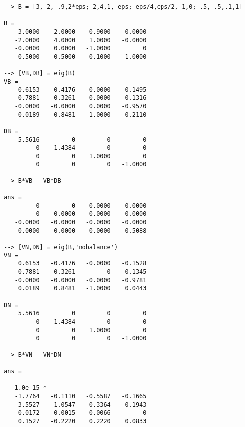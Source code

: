 \begin{verbatim}
--> B = [3,-2,-.9,2*eps;-2,4,1,-eps;-eps/4,eps/2,-1,0;-.5,-.5,.1,1]

B = 
    3.0000   -2.0000   -0.9000    0.0000 
   -2.0000    4.0000    1.0000   -0.0000 
   -0.0000    0.0000   -1.0000         0 
   -0.5000   -0.5000    0.1000    1.0000 

--> [VB,DB] = eig(B)
VB = 
    0.6153   -0.4176   -0.0000   -0.1495 
   -0.7881   -0.3261   -0.0000    0.1316 
   -0.0000   -0.0000    0.0000   -0.9570 
    0.0189    0.8481    1.0000   -0.2110 

DB = 
    5.5616         0         0         0 
         0    1.4384         0         0 
         0         0    1.0000         0 
         0         0         0   -1.0000 

--> B*VB - VB*DB

ans = 
         0         0    0.0000   -0.0000 
         0    0.0000   -0.0000    0.0000 
   -0.0000   -0.0000   -0.0000   -0.0000 
    0.0000    0.0000    0.0000   -0.5088 

--> [VN,DN] = eig(B,'nobalance')
VN = 
    0.6153   -0.4176   -0.0000   -0.1528 
   -0.7881   -0.3261         0    0.1345 
   -0.0000   -0.0000   -0.0000   -0.9781 
    0.0189    0.8481   -1.0000    0.0443 

DN = 
    5.5616         0         0         0 
         0    1.4384         0         0 
         0         0    1.0000         0 
         0         0         0   -1.0000 

--> B*VN - VN*DN

ans = 

   1.0e-15 * 
   -1.7764   -0.1110   -0.5587   -0.1665 
    3.5527    1.0547    0.3364   -0.1943 
    0.0172    0.0015    0.0066         0 
    0.1527   -0.2220    0.2220    0.0833 
\end{verbatim}
